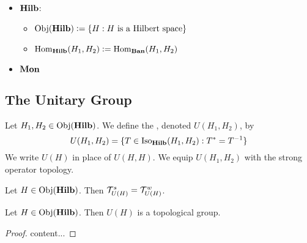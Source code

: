 \documentclass{book}
\begin{document}
	\begin{itemize}
		\item $\operatorname*{\text{\textbf{Hilb}}}$:  
		\begin{itemize}
			\item $\operatorname{Obj}(\operatorname*{\text{\textbf{Hilb}}}) \vcentcolon= \{H: H \text{ is a Hilbert space}\}$
			\item $\operatorname{Hom}_{\operatorname*{\text{\textbf{Hilb}}}}(H_1, H_2) \vcentcolon= \operatorname{Hom}_{\operatorname*{\text{\textbf{Ban}}}}(H_1, H_2)$
		\end{itemize}
		\item $\operatorname*{\text{\textbf{Mon}}}$
	\end{itemize}

	
	
	
	
	
	
	
	
	
	
	
	
	
	
	
	
	
	
	
	
	
	
	
	
	
	
	
	
	
	


	\subsection{The Unitary Group}
	
	\begin{defn}
		Let $H_1, H_2 \in \operatorname{Obj}(\operatorname*{\text{\textbf{Hilb}}})$. We define the , denoted $U(H_1, H_2)$, by 
		$$U(H_1, H_2) = \{T \in \operatorname{Iso}_{\operatorname*{\text{\textbf{Hilb}}}}(H_1, H_2): T^* = T^{-1}\}$$ 
		We write $U(H)$ in place of $U(H,H)$. We equip $U(H_1, H_2)$ with the strong operator topology. 
	\end{defn}
	
	\begin{ex}
		Let $H \in \operatorname{Obj}(\operatorname*{\text{\textbf{Hilb}}})$. Then $\mathcal{T}_{U(H)}^s = \mathcal{T}_{U(H)}^w$. 
	\end{ex}
	
	\begin{ex}
		Let $H \in \operatorname{Obj}(\operatorname*{\text{\textbf{Hilb}}})$. Then $U(H)$ is a topological group.
	\end{ex}
	
	\begin{proof}
		content...
	\end{proof}
	
	
	
\end{document}
